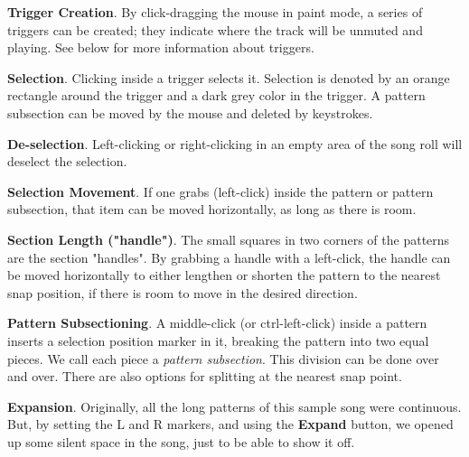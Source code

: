    \begin{enumber}
      \item \textbf{Trigger Creation}.
         By click-dragging the mouse in paint mode, a series of triggers can be
         created; they indicate where the track will be unmuted and playing.
         See below for more information about triggers.
      \item \textbf{Selection}.
         Clicking inside a trigger selects it.
         Selection is denoted by an orange rectangle around the trigger
         and a dark grey color in the trigger.
         A pattern subsection can be moved by the mouse and deleted by keystrokes.
      \item \textbf{De-selection}.
         Left-clicking or right-clicking in an empty area of the song roll
         will deselect the selection.
      \item \textbf{Selection Movement}.
         If one grabs (left-click) inside
         the pattern or pattern subsection, that item can be moved
         horizontally, as long as there is room.
      \item \textbf{Section Length ("handle")}.
         The small squares in two corners of the patterns are the section
         "handles".
         By grabbing a handle with a left-click, the handle can be moved
         horizontally to either lengthen or shorten the pattern to the nearest
         snap position, if there is room to move in the desired direction.
      \item \textbf{Pattern Subsectioning}.
         A middle-click (or ctrl-left-click)
         inside a pattern inserts a selection position
         marker in it, breaking the pattern into two equal pieces.
         We call each piece a \textsl{pattern subsection}.
         This division can be done over and over.
         There are also options for splitting at the nearest snap point.
      \item \textbf{Expansion}.
         Originally, all the long patterns of this sample song were continuous.
         But, by setting the L and R markers, and using the \textbf{Expand}
         button, we opened up some silent space in the song, just to be able
         to show it off.
   \end{enumber}

